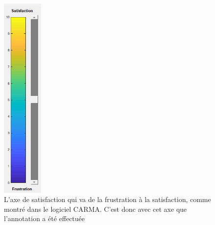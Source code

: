 \begin{figure}
  \centering
  \includegraphics[width=2cm]{./Chapitre4/figures/satisfactionAxis.png}
  \caption{L'axe de satisfaction qui va de la frustration à la satisfaction, comme montré dans le logiciel CARMA. C'est donc avec cet axe que l'annotation a été effectuée}
  \label{fig:satisfactionAxis}
\end{figure}
